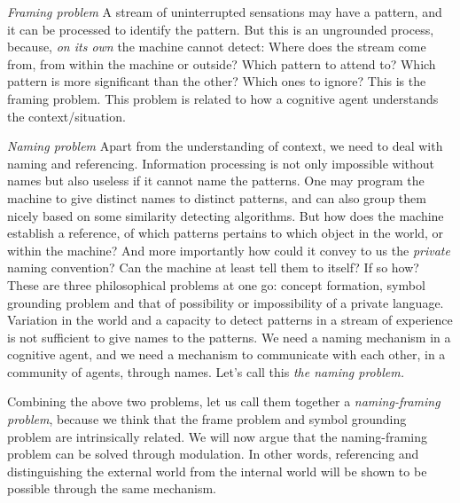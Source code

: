 \emph{Framing problem} A stream of uninterrupted sensations may have a pattern, and it can be processed to identify the pattern. But this is an ungrounded process, because, \textit{on its own} the machine cannot detect: Where does the stream come from, from within the machine or outside? Which pattern to attend to? Which pattern is more significant than the other? Which ones to ignore? This is the framing problem. This problem is related to how a cognitive agent understands the context/situation. 

\emph{Naming problem} Apart from the understanding of context, we need to deal with naming and referencing. Information processing is not only impossible without names but also useless if it cannot name the patterns. One may program the machine to give distinct names to distinct patterns, and can also group them nicely based on some similarity detecting algorithms. But how does the machine establish a reference, of which patterns pertains to which object in the world, or within the machine? And more importantly how could it convey to us the \textit{private} naming convention?  Can the machine at least tell them to itself?  If so how? These are three philosophical problems at one go: concept formation, symbol grounding problem and that of possibility or impossibility of a private language. Variation in the world and a capacity to detect patterns in a stream of experience is not sufficient to give names to the patterns. We need a naming mechanism in a cognitive agent, and we need a mechanism to communicate with each other, in a community of agents, through names. Let's call this \textit{the naming problem.} 

Combining the above two problems, let us call them together a \textit{naming-framing problem}, because we think that the frame problem and symbol grounding problem are intrinsically related. 
We will now argue that the naming-framing problem can be solved through modulation. In other words, referencing and distinguishing the external world from the internal world will be shown to be possible through the same mechanism. 

